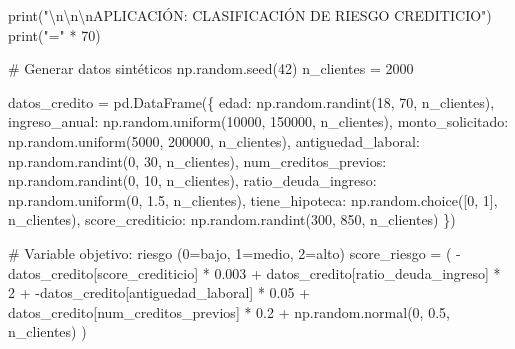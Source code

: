 \documentclass[
  doc,
  floatsintext,
  longtable,
  a4paper,
  nolmodern,
  notxfonts,
  notimes,
  12pt,
  colorlinks=true,linkcolor=blue,citecolor=blue,urlcolor=blue]{apa7}
\newenvironment{Shaded}{\begin{snugshade}}{\end{snugshade}}
\newcommand{\BuiltInTok}[1]{\textcolor[rgb]{0.00,0.23,0.31}{#1}}
\newcommand{\CharTok}[1]{\textcolor[rgb]{0.13,0.47,0.30}{#1}}
\newcommand{\CommentTok}[1]{\textcolor[rgb]{0.37,0.37,0.37}{#1}}
\newcommand{\DecValTok}[1]{\textcolor[rgb]{0.68,0.00,0.00}{#1}}
\newcommand{\FloatTok}[1]{\textcolor[rgb]{0.68,0.00,0.00}{#1}}
\newcommand{\NormalTok}[1]{\textcolor[rgb]{0.00,0.23,0.31}{#1}}
\newcommand{\OperatorTok}[1]{\textcolor[rgb]{0.37,0.37,0.37}{#1}}
\newcommand{\StringTok}[1]{\textcolor[rgb]{0.13,0.47,0.30}{#1}}
\begin{document}
\begin{Shaded}
\begin{Highlighting}[]
\BuiltInTok{print}\NormalTok{(}\StringTok{"}\CharTok{\textbackslash{}n\textbackslash{}n\textbackslash{}n}\StringTok{APLICACIÓN: CLASIFICACIÓN DE RIESGO CREDITICIO"}\NormalTok{)}
\BuiltInTok{print}\NormalTok{(}\StringTok{"="} \OperatorTok{*} \DecValTok{70}\NormalTok{)}

\CommentTok{\# Generar datos sintéticos}
\NormalTok{np.random.seed(}\DecValTok{42}\NormalTok{)}
\NormalTok{n\_clientes }\OperatorTok{=} \DecValTok{2000}

\NormalTok{datos\_credito }\OperatorTok{=}\NormalTok{ pd.DataFrame(\{}
    \StringTok{\textquotesingle{}edad\textquotesingle{}}\NormalTok{: np.random.randint(}\DecValTok{18}\NormalTok{, }\DecValTok{70}\NormalTok{, n\_clientes),}
    \StringTok{\textquotesingle{}ingreso\_anual\textquotesingle{}}\NormalTok{: np.random.uniform(}\DecValTok{10000}\NormalTok{, }\DecValTok{150000}\NormalTok{, n\_clientes),}
    \StringTok{\textquotesingle{}monto\_solicitado\textquotesingle{}}\NormalTok{: np.random.uniform(}\DecValTok{5000}\NormalTok{, }\DecValTok{200000}\NormalTok{, n\_clientes),}
    \StringTok{\textquotesingle{}antiguedad\_laboral\textquotesingle{}}\NormalTok{: np.random.randint(}\DecValTok{0}\NormalTok{, }\DecValTok{30}\NormalTok{, n\_clientes),}
    \StringTok{\textquotesingle{}num\_creditos\_previos\textquotesingle{}}\NormalTok{: np.random.randint(}\DecValTok{0}\NormalTok{, }\DecValTok{10}\NormalTok{, n\_clientes),}
    \StringTok{\textquotesingle{}ratio\_deuda\_ingreso\textquotesingle{}}\NormalTok{: np.random.uniform(}\DecValTok{0}\NormalTok{, }\FloatTok{1.5}\NormalTok{, n\_clientes),}
    \StringTok{\textquotesingle{}tiene\_hipoteca\textquotesingle{}}\NormalTok{: np.random.choice([}\DecValTok{0}\NormalTok{, }\DecValTok{1}\NormalTok{], n\_clientes),}
    \StringTok{\textquotesingle{}score\_crediticio\textquotesingle{}}\NormalTok{: np.random.randint(}\DecValTok{300}\NormalTok{, }\DecValTok{850}\NormalTok{, n\_clientes)}
\NormalTok{\})}

\CommentTok{\# Variable objetivo: riesgo (0=bajo, 1=medio, 2=alto)}
\NormalTok{score\_riesgo }\OperatorTok{=}\NormalTok{ (}
    \OperatorTok{{-}}\NormalTok{datos\_credito[}\StringTok{\textquotesingle{}score\_crediticio\textquotesingle{}}\NormalTok{] }\OperatorTok{*} \FloatTok{0.003} \OperatorTok{+}
\NormalTok{    datos\_credito[}\StringTok{\textquotesingle{}ratio\_deuda\_ingreso\textquotesingle{}}\NormalTok{] }\OperatorTok{*} \DecValTok{2} \OperatorTok{+}
    \OperatorTok{{-}}\NormalTok{datos\_credito[}\StringTok{\textquotesingle{}antiguedad\_laboral\textquotesingle{}}\NormalTok{] }\OperatorTok{*} \FloatTok{0.05} \OperatorTok{+}
\NormalTok{    datos\_credito[}\StringTok{\textquotesingle{}num\_creditos\_previos\textquotesingle{}}\NormalTok{] }\OperatorTok{*} \FloatTok{0.2} \OperatorTok{+}
\NormalTok{    np.random.normal(}\DecValTok{0}\NormalTok{, }\FloatTok{0.5}\NormalTok{, n\_clientes)}
\NormalTok{)}


\end{Highlighting}
\end{Shaded}
\end{document}
